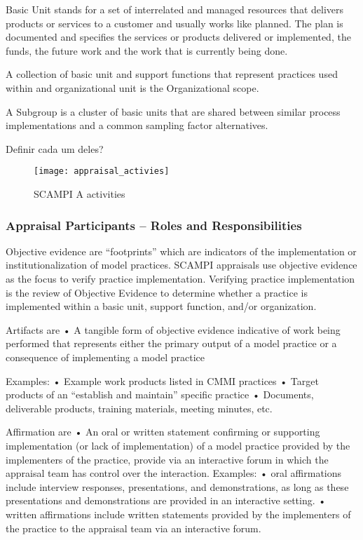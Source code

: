 Basic Unit stands for a set of interrelated and managed resources that delivers products or services to a customer and usually works like planned. The plan is documented and specifies the services or products delivered or implemented, the funds, the future work and the work that is currently being done.

A collection of basic unit and support functions that represent practices used within and organizational unit is the Organizational scope.


A Subgroup is a cluster of basic units that are shared between similar process implementations and a common sampling factor alternatives.



Definir cada um deles?

\begin{figure}[h]
	\begin{center}
		\leavevmode
		\texttt{[image: appraisal\_activies]}
		\caption{SCAMPI A activities}
		\label{fig:arch}
	\end{center}
\end{figure}


\subsubsection{Appraisal Participants – Roles and Responsibilities}

Objective evidence are “footprints” which are
indicators of the implementation or
institutionalization of model practices. SCAMPI appraisals use objective evidence as
the focus to verify practice implementation.
Verifying practice implementation is the review
of Objective Evidence to determine whether a
practice is implemented within a basic unit,
support function, and/or organization.

Artifacts are
• A tangible form of objective evidence indicative of work being
performed that represents either the primary output of a model
practice or a consequence of implementing a model practice

Examples:
• Example work products listed in CMMI practices
• Target products of an “establish and maintain” specific practice
• Documents, deliverable products, training materials, meeting
minutes, etc.

Affirmation are
• An oral or written statement confirming or supporting
implementation (or lack of implementation) of a model practice
provided by the implementers of the practice, provide via an
interactive forum in which the appraisal team has control over the
interaction.
Examples:
• oral affirmations include interview responses, presentations, and
demonstrations, as long as these presentations and
demonstrations are provided in an interactive setting.
• written affirmations include written statements provided by the
implementers of the practice to the appraisal team via an
interactive forum.



